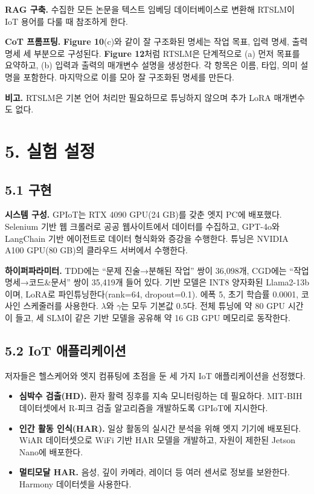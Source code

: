\documentclass[sigconf,nonacm]{acmart}
\begin{document}
\textbf{RAG 구축.} 수집한 모든 논문을 텍스트 임베딩 데이터베이스로 변환해 RTSLM이 IoT 용어를 다룰 때 참조하게 한다.

\textbf{CoT 프롬프팅.} \textbf{Figure 10}(c)와 같이 잘 구조화된 명세는 작업 목표, 입력 명세, 출력 명세 세 부분으로 구성된다. \textbf{Figure 12}처럼 RTSLM은 단계적으로 (a) 먼저 목표를 요약하고, (b) 입력과 출력의 매개변수 설명을 생성한다. 각 항목은 이름, 타입, 의미 설명을 포함한다. 마지막으로 이를 모아 잘 구조화된 명세를 만든다.

\textbf{비고.} RTSLM은 기본 언어 처리만 필요하므로 튜닝하지 않으며 추가 LoRA 매개변수도 없다.

\section{5. 실험 설정}

\subsection{5.1 구현}

\textbf{시스템 구성.} GPIoT는 RTX 4090 GPU(24 GB)를 갖춘 엣지 PC에 배포했다. Selenium 기반 웹 크롤러로 공공 웹사이트에서 데이터를 수집하고, GPT-4o와 LangChain 기반 에이전트로 데이터 형식화와 증강을 수행한다. 튜닝은 NVIDIA A100 GPU(80 GB)의 클라우드 서버에서 수행한다.

\textbf{하이퍼파라미터.} TDD에는 ``문제 진술→분해된 작업'' 쌍이 36,098개, CGD에는 ``작업 명세→코드\&문서'' 쌍이 35,419개 들어 있다. 기반 모델은 INT8 양자화된 Llama2-13b이며, LoRA로 파인튜닝한다(rank=64, dropout=0.1). 에폭 5, 초기 학습률 0.0001, 코사인 스케줄러를 사용한다. $\lambda$와 $\gamma$는 모두 기본값 0.5다. 전체 튜닝에 약 80 GPU 시간이 들고, 세 SLM이 같은 기반 모델을 공유해 약 16 GB GPU 메모리로 동작한다.

\subsection{5.2 IoT 애플리케이션}

저자들은 헬스케어와 엣지 컴퓨팅에 초점을 둔 세 가지 IoT 애플리케이션을 선정했다.
\begin{itemize}
\item \textbf{심박수 검출(HD).} 환자 활력 징후를 지속 모니터링하는 데 필요하다. MIT-BIH 데이터셋에서 R-피크 검출 알고리즘을 개발하도록 GPIoT에 지시한다.
\item \textbf{인간 활동 인식(HAR).} 일상 활동의 실시간 분석을 위해 엣지 기기에 배포된다. WiAR 데이터셋으로 WiFi 기반 HAR 모델을 개발하고, 자원이 제한된 Jetson Nano에 배포한다.
\item \textbf{멀티모달 HAR.} 음성, 깊이 카메라, 레이더 등 여러 센서로 정보를 보완한다. Harmony 데이터셋을 사용한다.
\end{itemize}
\end{document}
